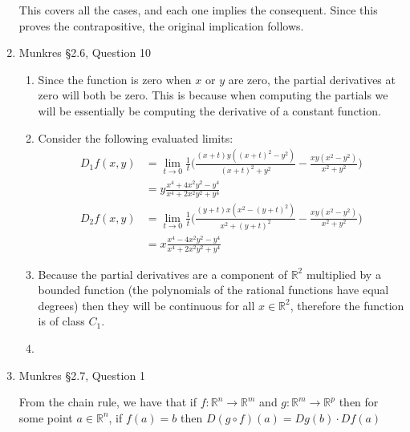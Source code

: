 \documentclass[letterpaper,10pt]{article}
\begin{document}
\begin{enumerate}
	This covers all the cases, and each one implies the consequent. Since this proves the contrapositive, the original implication follows.

	\item Munkres \S 2.6, Question 10

	\begin{enumerate}
		\item  Since the function is zero when $x$ or $y$ are zero, the partial derivatives at zero will both be zero. This is because when computing the partials we will be essentially be computing the derivative of a constant function.
		\item Consider the following evaluated limits:
		\begin{align*}
		D_1 f(x, y) & = \lim_{t \to 0} \frac{1}{t} \Bigg( \frac{(x+t) y ((x+t)^2 - y^2)}{(x+t)^2 + y^2} - \frac{x y (x^2 - y^2)}{x^2 + y^2} \Bigg) \\
		 & = y\frac{x^4 + 4x^2 y^2 - y^4}{x^4+2 x^2 y^2+y^4} \\
		D_2 f(x, y) & = \lim_{t \to 0} \frac{1}{t} \Bigg( \frac{(y+t) x (x^2 - (y+t)^2)}{x^2 + (y+t)^2} - \frac{x y (x^2 - y^2)}{x^2 + y^2} \Bigg) \\
		 & = x\frac{x^4 - 4x^2 y^2 - y^4}{x^4+2 x^2 y^2+y^4}
		\end{align*}
		\item Because the partial derivatives are a component of $\mathbb{R}^2$ multiplied by a bounded function (the polynomials of the rational functions have equal degrees) then they will be continuous for all $x \in \mathbb{R}^2$, therefore the function is of class $C_1$.
		\item 
	\end{enumerate}

	\item Munkres \S 2.7, Question 1

	From the chain rule, we have that if $f : \mathbb{R}^n \to \mathbb{R}^m$ and $g : \mathbb{R}^m \to \mathbb{R}^p$ then for some point $a \in \mathbb{R}^n$, if $f(a) = b$ then $D(g \circ f)(a) = Dg(b) \cdot Df(a)$


\end{enumerate}
\end{document}
